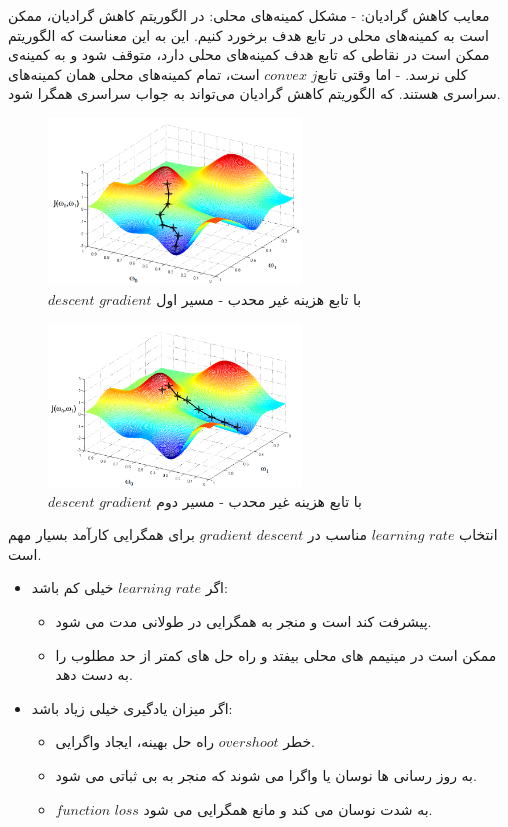 \documentclass[12pt]{article}
\begin{document}
معایب کاهش گرادیان:
- مشکل کمینه‌های محلی: در الگوریتم کاهش گرادیان، ممکن است به کمینه‌های محلی در تابع هدف برخورد کنیم. این به این معناست که الگوریتم ممکن است در نقاطی که تابع هدف کمینه‌های محلی دارد، متوقف شود و به کمینه‌ی کلی نرسد.
- اما وقتی تابع$j$ $convex$ است، تمام کمینه‌های محلی همان کمینه‌های سراسری هستند.
که
الگوریتم کاهش گرادیان می‌تواند به جواب سراسری همگرا شود.

\begin{figure}[htbp]
  \centering
  \includegraphics[width=0.6\textwidth]{etc/Images/Fig8.png} 
  \caption{$descent$ $gradient$ با تابع هزینه غیر محدب - مسیر اول}
  \label{fig8}
\end{figure}

\begin{figure}[htbp]
  \centering
  \includegraphics[width=0.6\textwidth]{etc/Images/Fig9.png} 
  \caption{$descent$ $gradient$  با تابع هزینه غیر محدب - مسیر دوم}
  \label{fig9}
\end{figure}

انتخاب $rate$ $learning$ مناسب در $descent$ $gradient$ برای همگرایی کارآمد بسیار مهم است.
\begin{itemize}
    \item اگر $rate$ $learning$ خیلی کم باشد:
    \begin{itemize}
        \item    پیشرفت کند است و منجر به همگرایی در طولانی مدت می شود.
        \item   ممکن است در مینیمم های محلی بیفتد و راه حل های کمتر از حد مطلوب را به دست دهد.
    \end{itemize}

    \item اگر میزان یادگیری خیلی زیاد باشد:
    \begin{itemize}
        \item 
    خطر $overshoot$ راه حل بهینه، ایجاد واگرایی.
        \item 
    به روز رسانی ها نوسان یا واگرا می شوند که منجر به بی ثباتی می شود.
        \item
    $function$ $loss$ به شدت نوسان می کند و مانع همگرایی می شود.
    \end{itemize}
\end{itemize}
\end{document}
